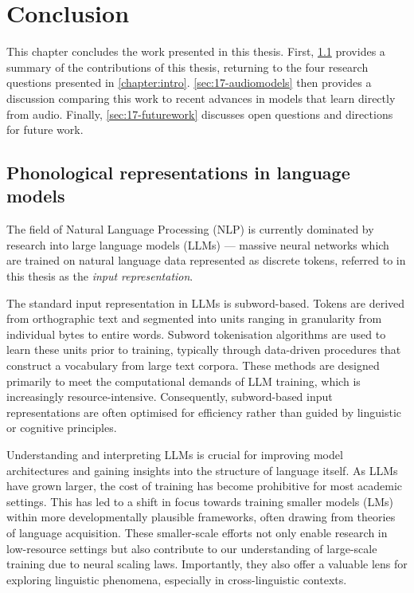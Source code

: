 \chapter{Conclusion}\label{chapter:conclusion}

This chapter concludes the work presented in this thesis. First, \cref{sec:17-summary} provides a summary of the contributions of this thesis, returning to the four research questions presented in \cref{chapter:intro}. \cref{sec:17-audiomodels} then provides a discussion comparing this work to recent advances in models that learn directly from audio. Finally, \cref{sec:17-futurework} discusses open questions and directions for future work.

\section{Phonological representations in language models}
\label{sec:17-summary}

The field of Natural Language Processing (NLP) is currently dominated by research into large language models (LLMs) --- massive neural networks which are trained on natural language data represented as discrete tokens, referred to in this thesis as the \emph{input representation}.

The standard input representation in LLMs is subword-based. Tokens are derived from orthographic text and segmented into units ranging in granularity from individual bytes to entire words. Subword tokenisation algorithms are used to learn these units prior to training, typically through data-driven procedures that construct a vocabulary from large text corpora. These methods are designed primarily to meet the computational demands of LLM training, which is increasingly resource-intensive. Consequently, subword-based input representations are often optimised for efficiency rather than guided by linguistic or cognitive principles.

Understanding and interpreting LLMs is crucial for improving model architectures and gaining insights into the structure of language itself. As LLMs have grown larger, the cost of training has become prohibitive for most academic settings. This has led to a shift in focus towards training smaller models (LMs) within more developmentally plausible frameworks, often drawing from theories of language acquisition. These smaller-scale efforts not only enable research in low-resource settings but also contribute to our understanding of large-scale training due to neural scaling laws. Importantly, they also offer a valuable lens for exploring linguistic phenomena, especially in cross-linguistic contexts.

